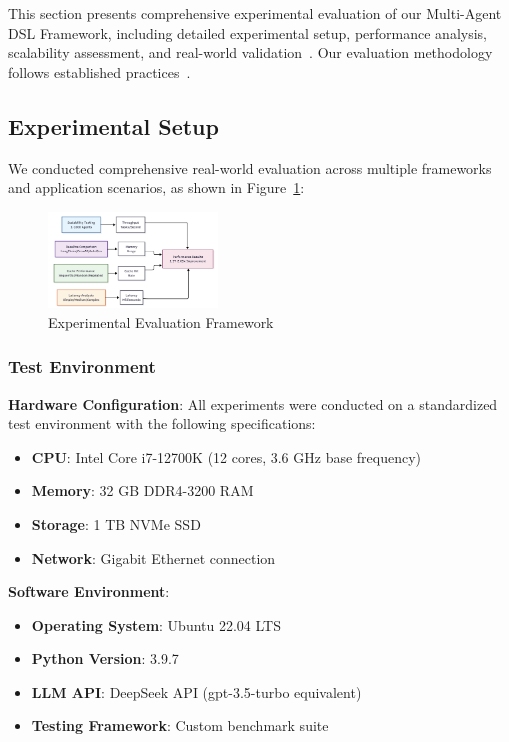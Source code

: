 \documentclass[conference]{IEEEtran}
\begin{document}
This section presents comprehensive experimental evaluation of our Multi-Agent DSL Framework, including detailed experimental setup, performance analysis, scalability assessment, and real-world validation~\cite{custom_benchmark2021,agent_sim2022,coulouris2011distributed}. Our evaluation methodology follows established practices~\cite{tanenbaum2007distributed,lamport2019distributed}.

\subsection{Experimental Setup}

We conducted comprehensive real-world evaluation across multiple frameworks and application scenarios, as shown in Figure~\ref{fig:experimental}:

\begin{figure}[htbp]
\centering
\includegraphics[width=0.4\textwidth]{figures/images/experimental_evaluation_framework.png}
\caption{Experimental Evaluation Framework}
\label{fig:experimental}
\end{figure}

\subsubsection{Test Environment}

\textbf{Hardware Configuration}: All experiments were conducted on a standardized test environment with the following specifications:
\begin{itemize}
\item \textbf{CPU}: Intel Core i7-12700K (12 cores, 3.6 GHz base frequency)
\item \textbf{Memory}: 32 GB DDR4-3200 RAM
\item \textbf{Storage}: 1 TB NVMe SSD
\item \textbf{Network}: Gigabit Ethernet connection
\end{itemize}

\textbf{Software Environment}: 
\begin{itemize}
\item \textbf{Operating System}: Ubuntu 22.04 LTS
\item \textbf{Python Version}: 3.9.7
\item \textbf{LLM API}: DeepSeek API (gpt-3.5-turbo equivalent)
\item \textbf{Testing Framework}: Custom benchmark suite
\end{itemize}
\end{document}
